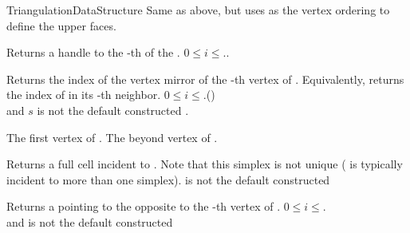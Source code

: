\begin{ccRefConcept}{TriangulationDataStructure}
\ccGlue{} {Same as above, but uses  as
 the vertex ordering to define the upper faces.}


{ Returns a handle to the -th  of the  .
\ccPrecond $0\leq i\leq$\ccVar..}

{Returns the index of the vertex mirror of the -th vertex of .
Equivalently, returns the index of  in its -th neighbor.
\ccPrecond $0\leq i\leq$\ccVar.()\\
and $s$ is not the default constructed . }

{}
{
The first vertex of \ccVar.
}
\ccGlue
{}
{
The beyond vertex of \ccVar.
}


{Returns a full cell incident to  . Note that this simplex is
not unique ( is typically incident to more than one simplex).
\ccPrecond{} is not the default constructed }

{ Returns a  pointing to the 
opposite to the -th vertex of . 
\ccPrecond$0\leq i \leq$\ccVar.\\
and  is not the default constructed }


\end{ccRefConcept}
